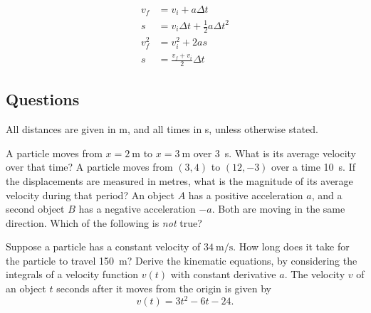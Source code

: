 \begin{align*}
  v_f &= v_i + a \Delta t\\
  s &= v_i \Delta t + \frac{1}{2} a {\Delta t}^2\\
  v_f^2 &= v_i^2 + 2a s\\
  s &= \frac{v_f + v_i}{2} \Delta t
\end{align*}

\subsection*{Questions}
All distances are given in \si{\metre}, and all times in \si{\second}, unless otherwise stated.
\begin{questions}
  \questioA A particle moves from $ x = \SI{2}{\metre} $ to $ x = \SI{3}{\metre} $ over \SI{3}{\second}. What is its average velocity over that time?
  \questioA A particle moves from $ (3,4) $ to $ (12,-3) $ over a time \SI{10}{\second}. If the displacements are measured in metres, what is the magnitude of
            its average velocity during that period?
  \questioA An object $ A $ has a positive acceleration $ a $, and a second object $ B $ has a negative acceleration $ -a $. Both are moving in the
            same direction. Which of the following is \textit{not} true?
  \questioA Suppose a particle has a constant velocity of $ \SI{34}{\metre\per\second} $. How long does it take for the particle to travel \SI{150}{\metre}?
  \questioM Derive the kinematic equations, by considering the integrals of a velocity function $ v(t) $ with constant derivative $ a $.
  \questioM The velocity $ v $ of an object $ t $ seconds after it moves from the origin is given by
            \begin{displaymath}
              v(t) = 3t^2 - 6t - 24.
            \end{displaymath}
    \begin{parts}

\end{parts}
\end{questions}
